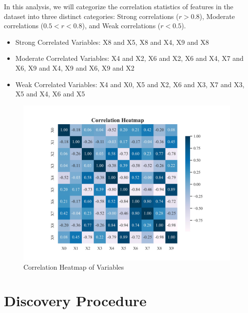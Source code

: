 \documentclass{article}
\begin{document}
\begin{minipage}[t]{0.5\linewidth}
In this analysis, we will categorize the correlation statistics of features in the dataset into three distinct categories: Strong correlations ($r>0.8$), Moderate correlations ($0.5<r<0.8$), and Weak correlations ($r<0.5$).

\begin{itemize}
\item Strong Correlated Variables: X8 and X5, X8 and X4, X9 and X8
\item Moderate Correlated Variables: X4 and X2, X6 and X2, X6 and X4, X7 and X6, X9 and X4, X9 and X6, X9 and X2
\item Weak Correlated Variables: X4 and X0, X5 and X2, X6 and X3, X7 and X3, X5 and X4, X6 and X5
\end{itemize}
\vfill
\end{minipage}
\hfill
\begin{minipage}[t]{0.5\linewidth}
\begin{figure}[H]
    \centering
    \vspace{-1.5cm}
    \includegraphics[width=\linewidth]{postprocess/test_data/20241018_020318_base_nodes10_samples2000/output_graph/eda_corr.jpg}
    \caption{\label{fig:corr}Correlation Heatmap of Variables}
\end{figure}
\end{minipage}

\section{Discovery Procedure}
\end{document}
